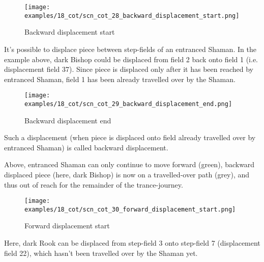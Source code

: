 \noindent
\begin{figure}[!h]
\vspace{-1.0\baselineskip}
\texttt{[image: examples/18\_cot/scn\_cot\_28\_backward\_displacement\_start.png]}
\caption{Backward displacement start}
\label{fig:scn_cot_28_backward_displacement_start}
\end{figure}

It's possible to displace piece between step-fields of an entranced Shaman. In the example
above, dark Bishop could be displaced from field 2 back onto field 1 (i.e. displacement
field 37). Since piece is displaced only after it has been reached by entranced Shaman,
field 1 has been already travelled over by the Shaman.

\clearpage %

\noindent
\begin{figure}[!h]
\texttt{[image: examples/18\_cot/scn\_cot\_29\_backward\_displacement\_end.png]}
\caption{Backward displacement end}
\label{fig:scn_cot_29_backward_displacement_end}
\end{figure}

Such a displacement (when piece is displaced onto field already travelled over
by entranced Shaman) is called backward displacement.

Above, entranced Shaman can only continue to move forward (green), backward displaced
piece (here, dark Bishop) is now on a travelled-over path (grey), and thus out of reach
for the remainder of the trance-journey.

\clearpage %

\noindent
\begin{figure}[!h]
\texttt{[image: examples/18\_cot/scn\_cot\_30\_forward\_displacement\_start.png]}
\caption{Forward displacement start}
\label{fig:scn_cot_30_forward_displacement_start}
\end{figure}

Here, dark Rook can be displaced from step-field 3 onto step-field 7 (displacement field 22),
which hasn't been travelled over by the Shaman yet.

